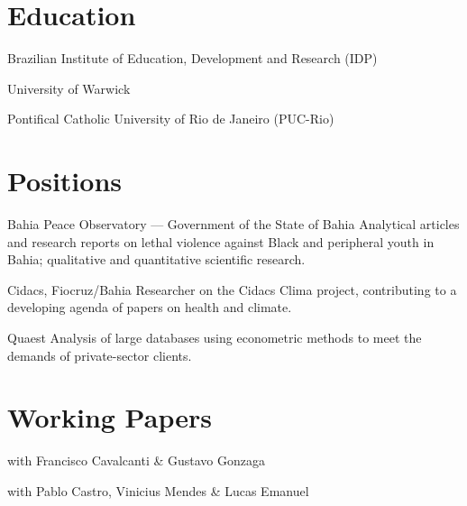 \documentclass[11pt,a4paper]{article}
\begin{document}
\cvheader

\section{Education}

      {Brazilian Institute of Education, Development and Research (IDP)}{}

      {University of Warwick}{}

      {Pontifical Catholic University of Rio de Janeiro (PUC-Rio)}{}

\section{Positions}

      {Bahia Peace Observatory --- Government of the State of Bahia}
      {Analytical articles and research reports on lethal violence against Black and
       peripheral youth in Bahia; qualitative and quantitative scientific research.}

      {Cidacs, Fiocruz/Bahia}
      {Researcher on the Cidacs Clima project, contributing to a developing agenda of
       papers on health and climate.}

      {Quaest}
      {Analysis of large databases using econometric methods to meet the demands of
       private-sector clients.}

\section{Working Papers}

      {with Francisco Cavalcanti \& Gustavo Gonzaga}

      {with Pablo Castro, Vinicius Mendes \& Lucas Emanuel}
\end{document}
